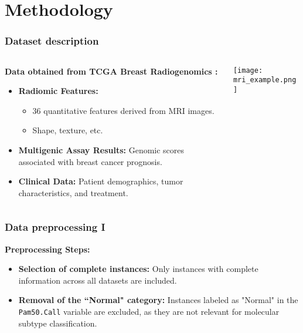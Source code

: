 \section{Methodology}


\begin{frame}
    \frametitle{Dataset description}
    \vspace{3mm}

	    \begin{columns}
	        \begin{column}{0.5\textwidth}
		    \textbf{Data obtained from TCGA Breast Radiogenomics \cite{b3}:}
		       \vspace{2mm}
		    \begin{itemize}
		        \item \textbf{Radiomic Features:}
		        \begin{itemize}
		            \item 36 quantitative features derived from MRI images.
		            \item Shape, texture, etc.
		        \end{itemize}
		        \vspace{2mm}
		        \item \textbf{Multigenic Assay Results:} Genomic scores associated with breast cancer prognosis.
		        \vspace{2mm}
		        \item \textbf{Clinical Data:} Patient demographics, tumor characteristics, and treatment.
		    \end{itemize}
		\end{column}
	        \begin{column}{0.4\textwidth}
	            \centering
	            \texttt{[image: mri\_example.png]}
	        \end{column}
	    \end{columns}
    \vfill 
\end{frame}


\begin{frame}
    \frametitle{Data preprocessing I }
    \vspace{3mm}

    \textbf{Preprocessing Steps:}
    \vspace{4mm}
    \begin{itemize}
        \item \textbf{Selection of complete instances:} Only instances with complete information across all datasets are included.
        \vspace{3mm}
        \item \textbf{Removal of the ``Normal" category:} Instances labeled as "Normal" in the \texttt{Pam50.Call} variable are excluded, as they are not relevant for molecular subtype classification.
        \end{itemize}
    \vfill 
\end{frame}

